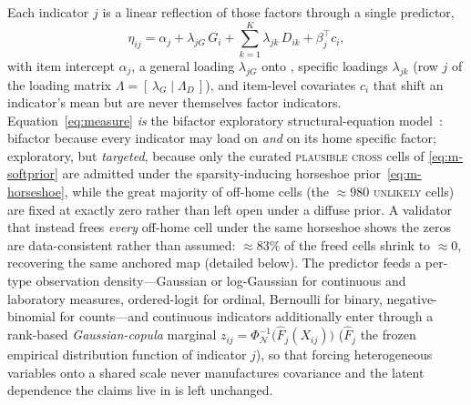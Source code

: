 Each indicator $j$ is a linear reflection of those factors through a single predictor,
\begin{equation}
  \eta_{ij}=\alpha_j+\lambda_{jG}\,G_i+\sum_{k=1}^{K}\lambda_{jk}\,D_{ik}+\beta_j^{\top}c_i ,
  \label{eq:measure}
\end{equation}
with item intercept $\alpha_j$, a general loading $\lambda_{jG}$ onto \Gfac{}, specific
loadings $\lambda_{jk}$ (row $j$ of the loading matrix
$\Lambda=[\,\lambda_G\mid\Lambda_D\,]$), and item-level covariates $c_i$ that shift an
indicator's mean but are never themselves factor indicators. Equation~\eqref{eq:measure}
\emph{is} the bifactor exploratory structural-equation
model~\citep{reise2012bifactor,asparouhov2009esem}: bifactor because every indicator may
load on \Gfac{} \emph{and} on its home specific factor; exploratory, but \emph{targeted},
because only the curated \textsc{plausible cross} cells of \eqref{eq:m-softprior} are
admitted under the sparsity-inducing horseshoe prior~\eqref{eq:m-horseshoe}, while the
great majority of off-home cells (the $\approx980$ \textsc{unlikely} cells) are fixed at
exactly zero rather than left open under a diffuse prior. A validator that instead frees
\emph{every} off-home cell under the same horseshoe shows the zeros are data-consistent
rather than assumed: $\approx83\%$ of the freed cells shrink to $\approx0$, recovering the
same anchored map (detailed below). The predictor feeds a per-type observation density---Gaussian
or log-Gaussian for continuous and laboratory measures, ordered-logit for ordinal,
Bernoulli for binary, negative-binomial for counts---and continuous indicators
additionally enter through a rank-based \emph{Gaussian-copula} marginal
$z_{ij}=\Phi_{\mathcal N}^{-1}\!\big(\hat F_j(X_{ij})\big)$ ($\hat F_j$ the frozen empirical
distribution function of indicator $j$), so that forcing heterogeneous variables onto a
shared scale never manufactures covariance and the latent dependence the claims live in is
left unchanged.

